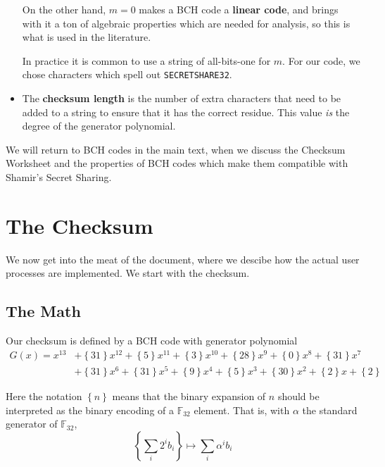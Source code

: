 \documentclass[letterpaper]{article}
\theoremstyle{xxx}
\theoremstyle{evil}
\theoremstyle{yyy}
\theoremstyle{plain}
\theoremstyle{zzz}
\newcommand{\fttwo}{\mathbb{F}_{32}}
\newcommand{\binrep}[1]{\left\{#1\right\}}
\begin{document}
\begin{itemize}
On the other hand, $m=0$ makes a BCH code a \textbf{linear code}, and brings
with it a ton of algebraic properties which are needed for analysis, so this
is what is used in the literature.

In practice it is common to use a string of all-bits-one for $m$. For our code,
we chose characters which spell out \texttt{SECRETSHARE32}.

\item The \textbf{checksum length} is the number of extra characters that
need to be added to a string to ensure that it has the correct residue.
This value \emph{is} the degree of the generator polynomial.
\end{itemize}

We will return to BCH codes in the main text, when we discuss the Checksum
Worksheet and the properties of BCH codes which make them compatible with
Shamir's Secret Sharing.

\section{The Checksum}

We now get into the meat of the document, where we descibe how the actual
user processes are implemented. We start with the checksum.

\subsection{The Math}
Our checksum is defined by a BCH code with generator polynomial
\begin{align*}
    G(x) = x^{13}
        &+ \binrep{31}x^{12} + \binrep{5}x^{11} + \binrep{3}x^{10} + \binrep{28}x^9 + \binrep{0}x^8 + \binrep{31}x^7\\
        &+ \binrep{31}x^6 + \binrep{31}x^5 + \binrep{9}x^4 + \binrep{5}x^3 + \binrep{30}x^2 + \binrep{2}x + \binrep{2}
\end{align*}

Here the notation $\binrep{n}$ means that the binary expansion of $n$ should be
interpreted as the binary encoding of a $\fttwo$ element. That is, with $\alpha$
the standard generator of $\fttwo$,
\[ \binrep{\sum_i 2^ib_i} \mapsto \sum_i \alpha^ib_i \]
\end{document}
